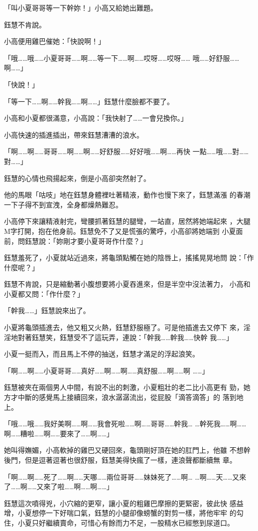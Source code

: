 「叫小夏哥哥等一下幹妳！」小高又給她出難題。

鈺慧不肯說。

小高便用雞巴催她：「快說啊！」

「哦……哦……小夏哥哥……啊……等一下……啊……哎呀……哎呀……
哦……好舒服……啊……」

「快說！」

「等一下……啊……幹我……啊……」鈺慧什麼臉都不要了。

小高和小夏都很滿意，小高說：「我快射了……一會兒換你。」

小高快速的插進插出，帶來鈺慧漕漕的浪水。

「啊……啊……哥哥……啊……啊……好舒服……好好哦……啊……再快
一點……哦……對……對……」

鈺慧的心情也飛揚起來，倒是小高卻突然射了。

他的馬眼「咕吱」地在鈺慧身體裡吐著精液，動作也慢下來了，鈺慧滿漲
的春潮一下子得不到宣洩，全身都燥熱難忍。

小高停下來讓精液射完，彎腰抓著鈺慧的腿彎，一站直，居然將她端起來
，大腿M字打開，抱在他身前。鈺慧免不了又是慌張的驚呼，小高卻將她端到
小夏面前，問鈺慧說：「妳剛才要小夏哥哥作什麼？」

鈺慧羞死了，小夏就站近過來，將龜頭點觸在她的陰唇上，搖搖晃晃地問
說：「作什麼呢？」

鈺慧不肯說，只是縮動著小腹想要將小夏吞進來，但是半空中沒法著力，
小高和小夏都又問：「作什麼？」

「幹我……」鈺慧說來出了。

小夏將龜頭插進去，他又粗又火熱，鈺慧舒服極了。可是他插進去又停下
來，淫淫地對著鈺慧笑，鈺慧受不了這玩弄，連說：「幹我……幹我……快幹
我……」

小夏一挺而入，而且馬上不停的抽送，鈺慧才滿足的浮起浪笑。

「啊……啊……小夏哥哥……真好……啊……啊……真舒服……啊……啊
……」

鈺慧被夾在兩個男人中間，有說不出的刺激，小夏粗壯的老二比小高更有
勁，她方才中斷的感覺馬上接續回來，浪水潺潺流出，從屁股「滴答滴答」的
落到地上。

「哦……哦……我好美啊……啊……我會死啦……啊……哥哥……幹我…
…幹死我……啊……啊……糟啦……啊……要來了……啊……」

她叫得嫵媚，小高軟掉的雞巴又硬回來，龜頭剛好頂在她的肛門上，他雖
不想幹後門，但是逗著逗著也很舒服，鈺慧美得快瘋了一樣，連浪聲都斷續無
章。

「啊……啊……死了……啊……天哪……兩位哥哥……妹妹死了……啊…
…啊……天……又來了……啊……又來了啦……啊……啊……」

鈺慧這次噴得兇，小穴縮的更窄，讓小夏的粗雞巴摩擦的更緊密，彼此快
感益增，小夏想停一下好喘口氣，鈺慧的小腿卻像螃蟹的對剪一樣，將他牢牢
的勾住，小夏只好繼續賣命，可惜心有餘而力不足，一股精水已經憋到尿道口。

